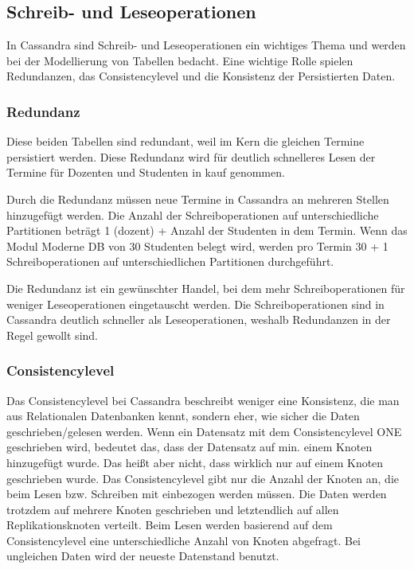 \newpage

\subsection{Schreib- und Leseoperationen}
In Cassandra sind Schreib- und Leseoperationen ein wichtiges Thema und werden bei der Modellierung von Tabellen bedacht. Eine wichtige Rolle spielen Redundanzen, das Consistencylevel und die Konsistenz der Persistierten Daten.

\vspace{12pt}

\subsubsection{Redundanz}
Diese beiden Tabellen sind redundant, weil im Kern die gleichen Termine persistiert werden. Diese Redundanz wird für deutlich schnelleres Lesen der Termine für Dozenten und Studenten in kauf genommen.

\vspace{6pt}

Durch die Redundanz müssen neue Termine in Cassandra an mehreren Stellen hinzugefügt werden. Die Anzahl der Schreiboperationen auf unterschiedliche Partitionen beträgt 1 (dozent) + Anzahl der Studenten in dem Termin. Wenn das Modul Moderne DB von 30 Studenten belegt wird, werden pro Termin 30 + 1 Schreiboperationen auf unterschiedlichen Partitionen durchgeführt. 

\vspace{6pt}

Die Redundanz ist ein gewünschter Handel, bei dem mehr Schreiboperationen für weniger Leseoperationen eingetauscht werden. Die Schreiboperationen sind in Cassandra deutlich schneller als Leseoperationen, weshalb Redundanzen in der Regel gewollt sind.

\vspace{12pt}

\subsubsection{Consistencylevel}
Das Consistencylevel bei Cassandra beschreibt weniger eine Konsistenz, die man aus Relationalen Datenbanken kennt, sondern eher, wie sicher die Daten geschrieben/gelesen werden. Wenn ein Datensatz mit dem Consistencylevel ONE geschrieben wird, bedeutet das, dass der Datensatz auf min. einem Knoten hinzugefügt wurde. Das heißt aber nicht, dass wirklich nur auf einem Knoten geschrieben wurde. Das Consistencylevel gibt nur die Anzahl der Knoten an, die beim Lesen bzw. Schreiben mit einbezogen werden müssen. Die Daten werden trotzdem auf mehrere Knoten geschrieben und letztendlich auf allen Replikationsknoten verteilt. Beim Lesen werden basierend auf dem Consistencylevel eine unterschiedliche Anzahl von Knoten abgefragt. Bei ungleichen Daten wird der neueste Datenstand benutzt. 

